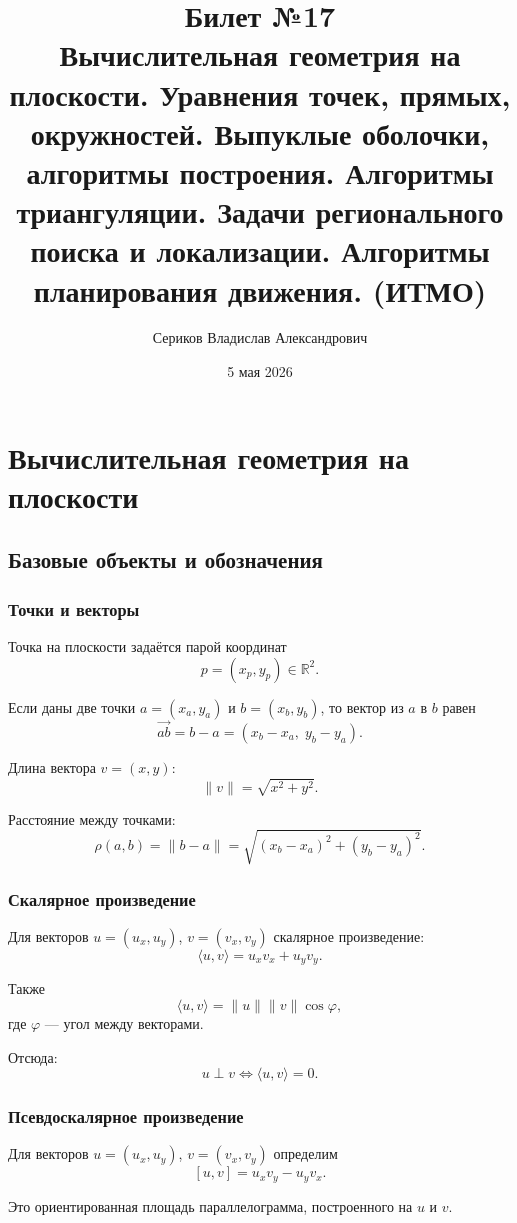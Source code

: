 \documentclass[12pt,a4paper]{article}
\title{Билет №17 \\ \small Вычислительная геометрия на плоскости. Уравнения точек, прямых, окружностей. Выпуклые оболочки, алгоритмы построения. Алгоритмы триангуляции. Задачи регионального поиска и локализации. Алгоритмы планирования движения. (ИТМО)}
\author{Сериков Владислав Александрович}
\date{5 мая 2026}
\begin{document}
\maketitle
\tableofcontents
\newpage

\section{Вычислительная геометрия на плоскости}

\subsection{Базовые объекты и обозначения}

\subsubsection{Точки и векторы}

Точка на плоскости задаётся парой координат
\[
p = (x_p, y_p) \in \mathbb{R}^2.
\]

Если даны две точки \(a=(x_a,y_a)\) и \(b=(x_b,y_b)\), то вектор из \(a\) в \(b\) равен
\[
\overrightarrow{ab} = b-a = (x_b-x_a,\; y_b-y_a).
\]

Длина вектора \(v=(x,y)\):
\[
\|v\| = \sqrt{x^2+y^2}.
\]

Расстояние между точками:
\[
\rho(a,b)=\|b-a\|=\sqrt{(x_b-x_a)^2+(y_b-y_a)^2}.
\]

\subsubsection{Скалярное произведение}

Для векторов \(u=(u_x,u_y)\), \(v=(v_x,v_y)\) скалярное произведение:
\[
\langle u,v\rangle = u_xv_x+u_yv_y.
\]

Также
\[
\langle u,v\rangle = \|u\|\|v\|\cos\varphi,
\]
где \(\varphi\) — угол между векторами.

Отсюда:
\[
u \perp v \Longleftrightarrow \langle u,v\rangle=0.
\]

\subsubsection{Псевдоскалярное произведение}

Для векторов \(u=(u_x,u_y)\), \(v=(v_x,v_y)\) определим
\[
[u,v] = u_xv_y-u_yv_x.
\]

Это ориентированная площадь параллелограмма, построенного на \(u\) и \(v\).
\end{document}
